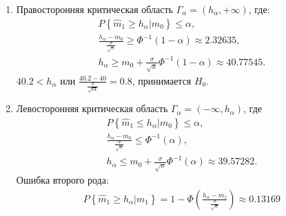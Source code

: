 \documentclass[a4paper,12pt]{article}
\newcommand{\probability}[1]{P \left\{ #1 \right\}}
\begin{document}
    \begin{enumerate}
        \item Правосторонняя критическая область $\Gamma_\alpha = (h_\alpha, + \infty)$, где:
              \begin{gather*}
                  \probability{\widehat{m}_1 \ge h_\alpha | m_0} \le \alpha , \\
                  \frac{h_\alpha - m_0}{\frac{\sigma}{\sqrt{n}}} \ge \Phi^{-1} (1 - \alpha) \approx 2.32635, \\
                  h_\alpha
                  \ge m_0 + \frac{\sigma}{\sqrt{n}} \Phi^{-1} (1 - \alpha)
                  \approx 40.77545.
              \end{gather*}
              $40.2 < h_\alpha$ или $\frac{40.2 - 40}{\frac{\sigma}{\sqrt{64}}} = 0.8$, принимается $H_0$.

        \item Левосторонняя критическая область $\Gamma_\alpha = (- \infty, h_\alpha)$, где        \begin{gather*}
                  \probability{\widehat{m}_1 \le h_\alpha | m_0} \le \alpha , \\
                  \frac{h_\alpha - m_0}{\frac{\sigma}{\sqrt{n}}} \le \Phi^{-1} (\alpha) , \\
                  h_\alpha
                  \le m_0 + \frac{\sigma}{\sqrt{n}} \Phi^{-1} (\alpha)
                  \approx 39.57282 .
              \end{gather*}
              Ошибка второго рода:
              \begin{gather*}
                  \probability{\widehat{m}_1 \ge h_\alpha | m_1}
                  = 1 - \Phi \left( \frac{h_\alpha - m_1}{\frac{\sigma}{\sqrt{n}}} \right)
                  \approx 0.13169
              \end{gather*}


\end{enumerate}
\end{document}
